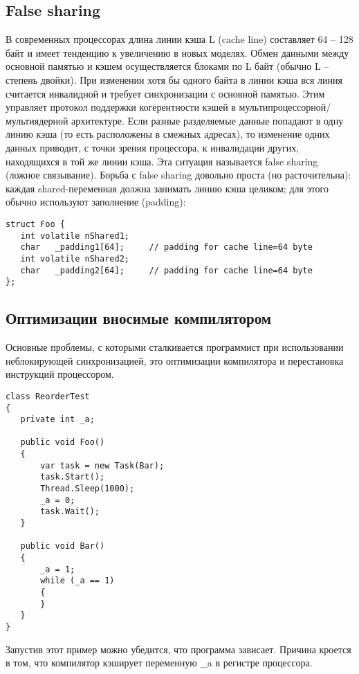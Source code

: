 \documentclass{article}
\begin{document}
\subsection{False sharing}

В современных процессорах длина линии кэша L (cache line) составляет 64 – 128 байт и имеет тенденцию к увеличению в новых моделях. Обмен данными между основной памятью и кэшем осуществляется блоками по L байт (обычно L – степень двойки). При изменении хотя бы одного байта в линии кэша вся линия считается инвалидной и требует синхронизации с основной памятью. Этим управляет протокол поддержки когерентности кэшей в мультипроцессорной/мультиядерной архитектуре.
Если разные разделяемые данные попадают в одну линию кэша (то есть расположены в смежных адресах), то изменение одних данных приводит, с точки зрения процессора, к инвалидации других, находящихся в той же линии кэша. Эта ситуация называется false sharing (ложное связывание).
Борьба с false sharing довольно проста (но расточительна): каждая shared-переменная должна занимать линию кэша целиком; для этого обычно используют заполнение (padding):

\begin{lstlisting}
struct Foo {
   int volatile nShared1;
   char   _padding1[64];	 // padding for cache line=64 byte
   int volatile nShared2;
   char   _padding2[64];	 // padding for cache line=64 byte
};
\end{lstlisting}

\subsection{Оптимизации вносимые компилятором}

Основные проблемы, с которыми сталкивается программист при использовании неблокирующей синхронизацией, это оптимизации компилятора и перестановка инструкций процессором. \\

\begin{lstlisting}
class ReorderTest
{
   private int _a;

   public void Foo()
   {
       var task = new Task(Bar);
       task.Start();
       Thread.Sleep(1000);
       _a = 0;
       task.Wait();
   }

   public void Bar()
   {
       _a = 1;
       while (_a == 1)
       {
       }
   }
}
\end{lstlisting}

Запустив этот пример можно убедится, что программа зависает. Причина кроется в том, что компилятор кэширует переменную \_a в регистре процессора.\\
\end{document}
